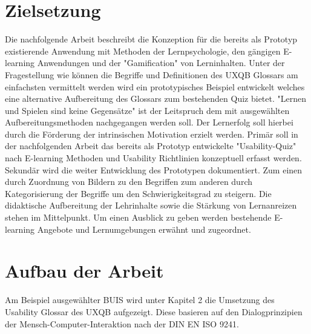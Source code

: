 \documentclass[a4paper, 12pt, twoside, BCOR=20mm, DIV=calc, abstracton, parskip=half*, toc=bibliography, toc=listof, headsepline, footsepline, headings=small, numbers=enddot]{scrreprt}
\begin{document}
\section{Zielsetzung}
Die nachfolgende Arbeit beschreibt die Konzeption für die bereits als Prototyp existierende Anwendung mit Methoden der Lernpsychologie, den gängigen E-learning Anwendungen und der "Gamification" von Lerninhalten. Unter der Fragestellung wie können die Begriffe und Definitionen des \ac{UXQB} Glossars am einfachsten vermittelt werden wird ein prototypisches Beispiel entwickelt welches eine alternative Aufbereitung des Glossars zum bestehenden Quiz bietet. "Lernen und Spielen sind keine Gegensätze" \cite{dewey1995erfahrung}
ist der Leitspruch dem mit ausgewählten Aufbereitungsmethoden nachgegangen werden soll. Der Lernerfolg soll hierbei durch die Förderung der intrinsischen Motivation erzielt werden. 
Primär soll in der nachfolgenden Arbeit das bereits als Prototyp entwickelte "Usability-Quiz" nach E-learning Methoden und Usability Richtlinien konzeptuell erfasst werden. Sekundär wird die weiter Entwicklung des Prototypen dokumentiert. Zum einen durch Zuordnung von Bildern zu den Begriffen zum anderen durch Kategorisierung der Begriffe um den Schwierigkeitsgrad zu steigern. Die didaktische Aufbereitung der Lehrinhalte sowie die Stärkung von Lernanreizen stehen im Mittelpunkt. Um einen Ausblick zu geben werden bestehende E-learning Angebote und Lernumgebungen erwähnt und zugeordnet. 

\section{Aufbau der Arbeit}
Am Beispiel ausgewählter \ac{BUIS} wird unter Kapitel 2 die Umsetzung des Usability Glossar des \ac{UXQB} aufgezeigt. Diese basieren auf den Dialogprinzipien der Mensch-Computer-Interaktion nach der DIN EN ISO 9241\cite{cpux-f}.  
\end{document}

